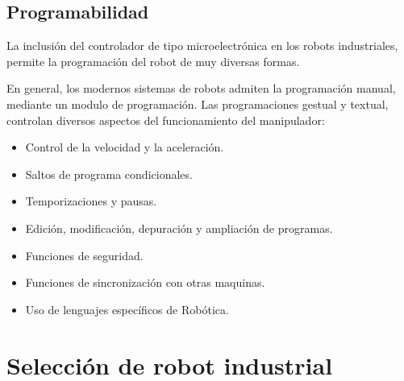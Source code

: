 \documentclass[12pt,a4paper]{report}
\begin{document}
\subsection{Programabilidad}

La inclusión del controlador de tipo microelectrónica en los robots
industriales, permite la programación del robot de muy diversas formas.

En general, los modernos sistemas de robots admiten la programación manual,
mediante un modulo de programación. Las programaciones gestual y textual,
controlan diversos aspectos del funcionamiento del manipulador:

\begin{itemize}
    \item Control de la velocidad y la aceleración.  
    \item Saltos de programa condicionales.  
    \item Temporizaciones y pausas.  
    \item Edición, modificación, depuración y ampliación de programas.  
    \item Funciones de seguridad.  
    \item Funciones de sincronización con otras maquinas.  
    \item Uso de lenguajes específicos de Robótica.
\end{itemize}


\section{Selección de robot industrial}
\end{document}
